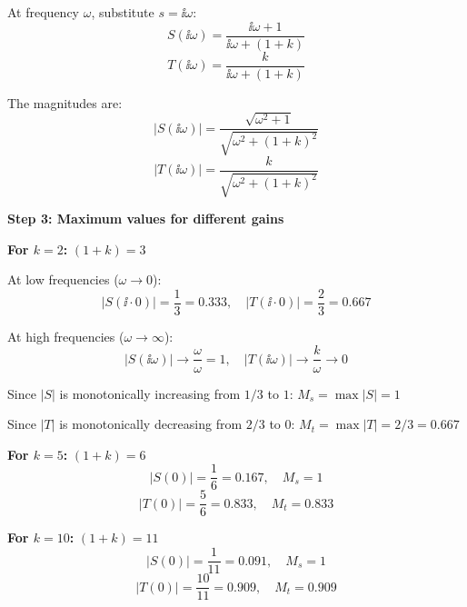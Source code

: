 \documentclass[11pt,a4paper]{article}
\begin{document}
At frequency $\omega$, substitute $s = \ii\omega$:
\begin{equation}
  S(\ii\omega) = \frac{\ii\omega + 1}{\ii\omega + (1+k)}
\end{equation}
\begin{equation}
  T(\ii\omega) = \frac{k}{\ii\omega + (1+k)}
\end{equation}

The magnitudes are:
\begin{equation}
  |S(\ii\omega)| = \frac{\sqrt{\omega^2 + 1}}{\sqrt{\omega^2 + (1+k)^2}}
\end{equation}
\begin{equation}
  |T(\ii\omega)| = \frac{k}{\sqrt{\omega^2 + (1+k)^2}}
\end{equation}

\textbf{Step 3: Maximum values for different gains}

\textbf{For $k = 2$:} $(1+k) = 3$

At low frequencies ($\omega \to 0$):
\begin{equation}
  |S(\ii \cdot 0)| = \frac{1}{3} = 0.333, \quad |T(\ii \cdot 0)| = \frac{2}{3} = 0.667
\end{equation}

At high frequencies ($\omega \to \infty$):
\begin{equation}
  |S(\ii\omega)| \to \frac{\omega}{\omega} = 1, \quad |T(\ii\omega)| \to \frac{k}{\omega} \to 0
\end{equation}

Since $|S|$ is monotonically increasing from $1/3$ to $1$: $M_s = \max |S| = 1$

Since $|T|$ is monotonically decreasing from $2/3$ to $0$: $M_t = \max |T| = 2/3 = 0.667$

\textbf{For $k = 5$:} $(1+k) = 6$
\begin{equation}
  |S(0)| = \frac{1}{6} = 0.167, \quad M_s = 1
\end{equation}
\begin{equation}
  |T(0)| = \frac{5}{6} = 0.833, \quad M_t = 0.833
\end{equation}

\textbf{For $k = 10$:} $(1+k) = 11$
\begin{equation}
  |S(0)| = \frac{1}{11} = 0.091, \quad M_s = 1
\end{equation}
\begin{equation}
  |T(0)| = \frac{10}{11} = 0.909, \quad M_t = 0.909
\end{equation}
\end{document}
